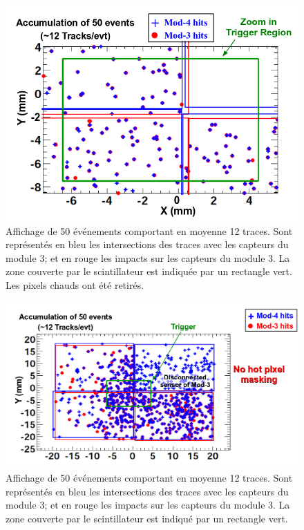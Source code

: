    \begin{figure}[!htb]
    \begin{center} 
      \includegraphics[scale=0.37]{./figures/SALAT_beam_test/correl_zone_trig_no_hot_px.png}
      \caption{Affichage de 50 \'ev\'enements comportant en moyenne 12 traces. Sont repr\'esentés en bleu les intersections des traces avec les capteurs du module 3; et en rouge les impacts sur les capteurs du module 3. La zone couverte par le scintillateur est indiqu\'ee par un rectangle vert. Les pixels chauds ont \'et\'e retir\'es.}
      \label{fig:associations_super_plan_trigger}
    \end{center}
   \end{figure}
   
   \begin{figure}[!htb]
    \begin{center} 
      \includegraphics[scale=0.37]{./figures/SALAT_beam_test/hits_correlations_super_plan.png}
      \caption{Affichage de 50 \'ev\'enements comportant en moyenne 12 traces. Sont repr\'esentés en bleu les intersections des traces avec les capteurs du module 3; et en rouge les impacts sur les capteurs du module 3. La zone couverte par le scintillateur est indiqu\'e par un rectangle vert.}
      \label{fig:associations_super_plan}
    \end{center}
   \end{figure} 
  
